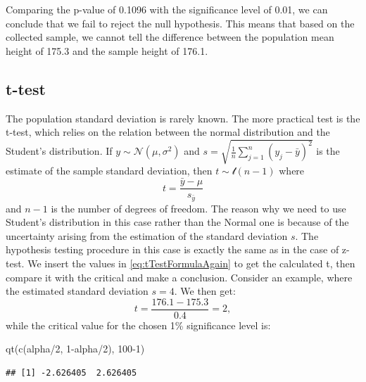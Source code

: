\documentclass[
]{book}
\newenvironment{Shaded}{\begin{snugshade}}{\end{snugshade}}
\newcommand{\DecValTok}[1]{\textcolor[rgb]{0.00,0.00,0.81}{#1}}
\newcommand{\FunctionTok}[1]{\textcolor[rgb]{0.00,0.00,0.00}{#1}}
\newcommand{\NormalTok}[1]{#1}
\newcommand{\SpecialCharTok}[1]{\textcolor[rgb]{0.00,0.00,0.00}{#1}}
\theoremstyle{definition}
\theoremstyle{definition}
\theoremstyle{definition}
\theoremstyle{definition}
\theoremstyle{remark}
\begin{document}
Comparing the p-value of 0.1096 with the significance level of 0.01, we can conclude that we fail to reject the null hypothesis. This means that based on the collected sample, we cannot tell the difference between the population mean height of 175.3 and the sample height of 176.1.

\hypertarget{statisticalTestsOneSampleMeanT}{%
\subsection{t-test}\label{statisticalTestsOneSampleMeanT}}

The population standard deviation is rarely known. The more practical test is the t-test, which relies on the relation between the normal distribution and the Student's distribution. If \(y \sim \mathcal{N}(\mu ,\sigma^2)\) and \(s=\sqrt{\frac{1}{n}\sum_{j=1}^n{\left(y_j-\bar{y}\right)^2}}\) is the estimate of the sample standard deviation, then \(t \sim \mathcal{t}(n-1)\) where
\begin{equation}
    t = \frac{\bar{y}-\mu}{s_{\bar{y}}} 
    \label{eq:tTestFormulaAgain}
\end{equation}
and \(n-1\) is the number of degrees of freedom. The reason why we need to use Student's distribution in this case rather than the Normal one is because of the uncertainty arising from the estimation of the standard deviation \(s\). The hypothesis testing procedure in this case is exactly the same as in the case of z-test. We insert the values in \eqref{eq:tTestFormulaAgain} to get the calculated t, then compare it with the critical and make a conclusion. Consider an example, where the estimated standard deviation \(s=4\). We then get:
\begin{equation*}
    t = \frac{176.1-175.3}{0.4} = 2 ,
\end{equation*}
while the critical value for the chosen 1\% significance level is:

\begin{Shaded}
\begin{Highlighting}[]
\FunctionTok{qt}\NormalTok{(}\FunctionTok{c}\NormalTok{(alpha}\SpecialCharTok{/}\DecValTok{2}\NormalTok{, }\DecValTok{1}\SpecialCharTok{{-}}\NormalTok{alpha}\SpecialCharTok{/}\DecValTok{2}\NormalTok{), }\DecValTok{100{-}1}\NormalTok{)}
\end{Highlighting}
\end{Shaded}

\begin{verbatim}
## [1] -2.626405  2.626405
\end{verbatim}
\end{document}
